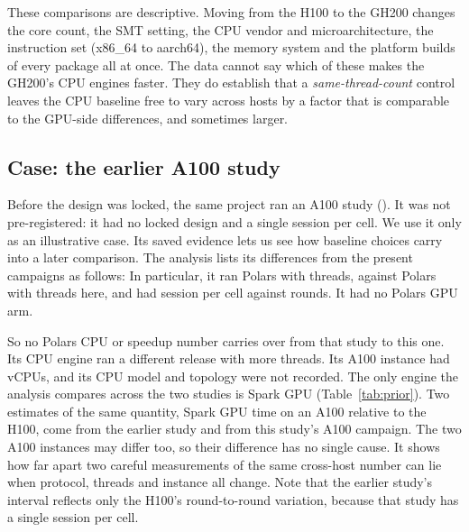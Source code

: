 \documentclass[11pt]{article}
\begin{document}
These comparisons are descriptive. Moving from the H100 to the GH200 changes
the core count, the SMT setting, the CPU vendor and microarchitecture, the
instruction set (x86\_64 to aarch64), the memory system and the platform
builds of every package all at once. The data cannot say which of these makes
the GH200's CPU engines faster. They do establish that a
\emph{same-thread-count} control leaves the CPU baseline free to vary across
hosts by a factor that is comparable to the GPU-side differences, and
sometimes larger.

\subsection{Case: the earlier A100 study}
\label{sec:res-prior}

Before the design was locked, the same project ran an A100 study
(). It was not pre-registered: it had no locked
design and a single session per cell. We use it only as an illustrative case. Its saved evidence lets us see how baseline
choices carry into a later comparison. The analysis lists its differences from
the present campaigns as follows: 
In particular, it ran Polars  with
 threads, against Polars
 with
 threads here, and
had  session per cell against
 rounds. It had no Polars GPU arm.

So no Polars CPU or speedup number carries over from that study to this one.
Its CPU engine ran a different release with more threads. Its A100 instance
had  vCPUs, and its CPU model and topology were
not recorded.
The only engine the analysis compares across the two studies is Spark GPU
(Table~\ref{tab:prior}). Two estimates of the same quantity, Spark GPU time on
an A100 relative to the H100, come from the earlier study and from this
study's A100 campaign. The two A100 instances may differ too, so their difference
has no single cause. It shows how far apart two careful measurements of the
same cross-host number can lie when protocol, threads and instance all change. Note that the earlier
study's interval reflects only the H100's round-to-round variation, because
that study has a single session per cell.
\end{document}
